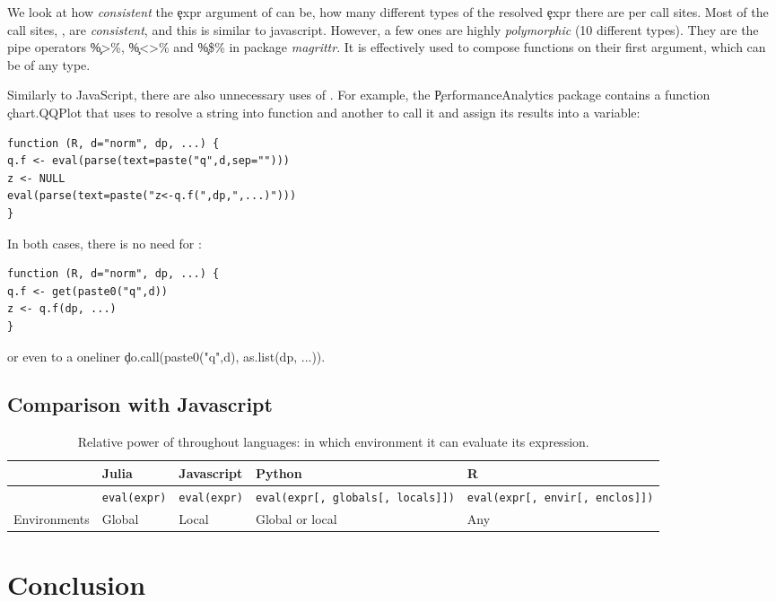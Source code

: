 \documentclass[acmsmall]{acmart}
\begin{document}
We look at how \emph{consistent} the \c{expr} argument of \eval can
be, \ie how many different types of the resolved \c{expr} there are
per call sites. Most of the call sites, \ie \PercentMonomorphic, are
\emph{consistent}, and this is similar to javascript. However, a few
ones are highly \emph{polymorphic} (10 different types). They are the
pipe operators \c{\%>\%}, \c{\%<>\%} and \c{\%\$\%} in package
\emph{magrittr}. It is effectively used to compose functions on their
first argument, which can be of any type.

Similarly to JavaScript, there are also unnecessary uses of \eval. For
example, the \c{PerformanceAnalytics} package contains a function
\c{chart.QQPlot} that uses \eval to resolve a string into function and
another to call it and assign its results into a variable:
\begin{lstlisting}
function (R, d="norm", dp, ...) {
q.f <- eval(parse(text=paste("q",d,sep="")))
z <- NULL
eval(parse(text=paste("z<-q.f(",dp,",...)")))
}
\end{lstlisting}
  In both cases, there is no need for \eval:
\begin{lstlisting}
function (R, d="norm", dp, ...) {
q.f <- get(paste0("q",d))
z <- q.f(dp, ...)
}
\end{lstlisting}
  or even to a oneliner \c{do.call(paste0("q",d), as.list(dp, ...))}.

\subsection{Comparison with Javascript}




\begin{table}[h]
	\begin{tabularx}{\textwidth}{|X|X|X|X|X|}
		\hline
		& Julia & Javascript & Python & R \tabularnewline
		\hline %
		{\eval} & \texttt{eval(expr)} & \texttt{eval(expr)} & \texttt{eval(expr[, globals[, locals]])} &  \texttt{eval(expr[, envir[, enclos]])}  \tabularnewline
		\hline 
		Environments &Global  & Local & Global or local  & Any \tabularnewline
		\hline
	\end{tabularx}
	\caption{Relative power of \eval throughout languages: in which environment it can evaluate its expression.}
\end{table}


\section{Conclusion}




\end{document}
